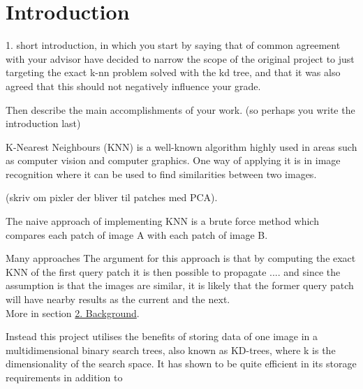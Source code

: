 \section{Introduction}
\label{sec:intro}
1. short introduction, in which you start by saying that of common agreement
with your advisor have decided to narrow the scope of the original project to
just targeting the exact k-nn problem solved with the kd tree, and that it was
also agreed that this should not negatively influence your grade.

Then describe the main accomplishments of your work.
(so perhaps you write the introduction last)


K-Nearest Neighbours (KNN) is a well-known algorithm highly used in areas such as computer vision and computer graphics. One way of applying it is in image recognition where it can be used to find similarities between two images. 

(skriv om pixler der bliver til patches med PCA).

The naive approach of implementing KNN is a brute force method which compares each patch of image A with each patch of image B. 


Many approaches 
\cite{kdann} The argument for this approach is that by computing the exact KNN of the first query patch it is then possible to propagate .... and since the assumption is that the images are similar, it is likely that the former query patch will have nearby results as the current and the next. 
\\[2mm]


More in section \hyperref[sec:back]{2. Background}.


Instead this project utilises the benefits of storing data of one image in a multidimensional binary search trees, also known as KD-trees, where k is the dimensionality of the search space. It has shown to be quite efficient in its storage requirements in addition to 





